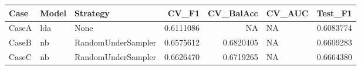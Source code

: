 
\begin{tabular}{lllrrlr}
\toprule
Case & Model & Strategy & CV\_F1 & CV\_BalAcc & CV\_AUC & Test\_F1\\
\midrule
CaseA & lda & None & 0.6111086 & NA & NA & 0.6083774\\
CaseB & nb & RandomUnderSampler & 0.6575612 & 0.6820405 & NA & 0.6609283\\
CaseC & nb & RandomUnderSampler & 0.6626470 & 0.6719265 & NA & 0.6664380\\
\bottomrule
\end{tabular}
